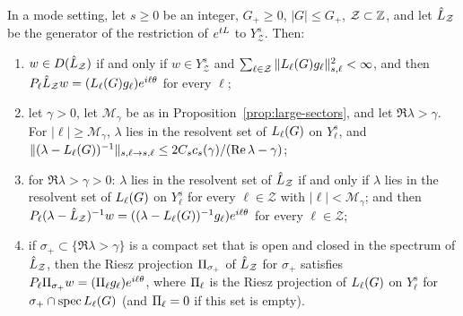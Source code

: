 \begin{lemma}
\label{lem:sector-sum}
In a mode setting, let $s\ge0$ be an integer, $G_+\ge0$, $|G|\le G_+$,
$\mathcal Z\subset\mathbb{Z}$, and let $\hat{L}_{\mathcal Z}$ be the generator of the restriction of
$e^{tL}$ to $Y^s_{\mathcal Z}$. Then:
\begin{enumerate}[label=\textup{(\arabic*)}]
\item $w\in D(\hat{L}_{\mathcal Z})$ if and only if $w\in Y^s_{\mathcal Z}$ and
  $\sum_{\ell\in\mathcal Z}\|L_{\ell}(G)g_\ell\|^2_{s,\ell}<\infty$, and then
  $P_\ell\hat{L}_{\mathcal Z} w=(L_{\ell}(G)g_\ell)e^{i\ell\theta}$ for every $\ell$;
\item let $\gamma>0$, let $\mathcal M_\gamma$ be as in Proposition~\ref{prop:large-sectors},
  and let $\Re\lambda>\gamma$. For $|\ell|\ge\mathcal M_\gamma$, $\lambda$ lies in the
  resolvent set of $L_{\ell}(G)$ on $Y^s_\ell$, and
  $\|(\lambda-L_{\ell}(G))^{-1}\|_{s,\ell\to s,\ell}\le2C_sc_s(\gamma)/(\Re\lambda-\gamma)$;
\item for $\Re\lambda>\gamma>0$: $\lambda$ lies in the resolvent set of $\hat{L}_{\mathcal Z}$
  if and only if $\lambda$ lies in the resolvent set of $L_{\ell}(G)$ on
  $Y^s_\ell$ for every $\ell\in\mathcal Z$ with $|\ell|<\mathcal M_\gamma$; and then
  $P_\ell(\lambda-\hat{L}_{\mathcal Z})^{-1}w=((\lambda-L_{\ell}(G))^{-1}g_\ell)e^{i\ell\theta}$
  for every $\ell\in\mathcal Z$;
\item if $\sigma_+\subset\{\Re\lambda>\gamma\}$ is a compact set that is open and
  closed in the spectrum of $\hat{L}_{\mathcal Z}$, then the Riesz projection $\Pi_{\sigma_+}$
  of $\hat{L}_{\mathcal Z}$ for $\sigma_+$ satisfies
  $P_\ell\Pi_{\sigma_+}w=(\Pi_{\ell}g_\ell)e^{i\ell\theta}$, where $\Pi_\ell$ is
  the Riesz projection of $L_{\ell}(G)$ on $Y^s_\ell$ for
  $\sigma_+\cap\operatorname{spec}L_{\ell}(G)$ \textup{(}and $\Pi_\ell=0$ if this set is
  empty\textup{)}.
\end{enumerate}
\end{lemma}
